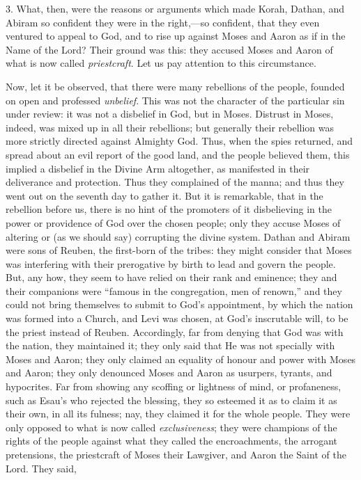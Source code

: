 3. What, then, were the reasons or arguments which made Korah,
Dathan, and Abiram so confident they were in the right,—so
confident, that they even ventured to appeal to God, and to rise up
against Moses and Aaron as if in the Name of the Lord? Their ground
was this: they accused Moses and Aaron of what is now called \emph{priestcraft}.
Let us pay attention to this circumstance.

Now, let it be observed, that there were many rebellions of the
people, founded on open and professed \emph{unbelief}. This was not
the character of the particular sin under review: it was not a
disbelief in God, but in Moses. Distrust in Moses, indeed, was mixed
up in all their rebellions; but generally their rebellion was more
strictly directed against Almighty God. Thus, when the spies returned,
and spread about an evil report of the good land, and the people
believed them, this implied a disbelief in the Divine Arm altogether,
as manifested in their deliverance and protection. Thus they
complained of the manna; and thus they went out on the seventh day to
gather it. But it is remarkable, that in the rebellion before us,
there is no hint of the promoters of it disbelieving in the power or
providence of God over the chosen people; only they accuse Moses of
altering or (as we should say) corrupting the divine system. Dathan
and Abiram were sons of Reuben, the first-born of the tribes: they
might consider that Moses was interfering with their prerogative by
birth to lead and govern the people. But, any how, they seem to have
relied on their rank and eminence; they and their companions were
``famous in the congregation, men of renown,'' and they could
not bring themselves to submit to God's appointment, by which the
nation was formed into a Church, and Levi was chosen, at God's
inscrutable will, to be the priest instead of Reuben. Accordingly, far
from denying that God was with the nation, they maintained it; they
only said that He was not specially with Moses and Aaron; they only
claimed an equality of honour and power with Moses and Aaron; they
only denounced Moses and Aaron as usurpers, tyrants, and hypocrites.
Far from showing any scoffing or lightness of mind, or profaneness,
such as Esau's who rejected the blessing, they so esteemed it as to
claim it as their own, in all its fulness; nay, they claimed it for
the whole people. They were only opposed to what is now called \emph{exclusiveness};
they were champions of the rights of the people against what they
called the encroachments, the arrogant pretensions, the priestcraft of
Moses their Lawgiver, and Aaron the Saint of the Lord. They said,
